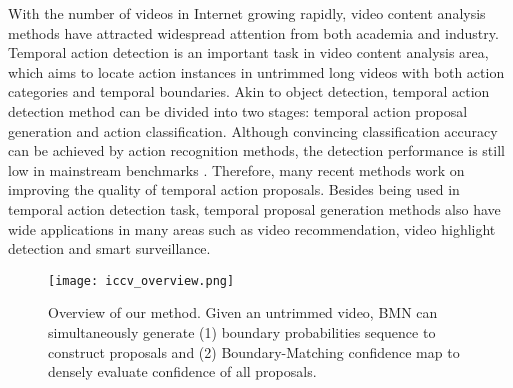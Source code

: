 \documentclass[10pt,twocolumn,letterpaper]{article}
\begin{document}
With the number of videos in Internet growing rapidly, video content analysis methods have attracted widespread attention from both academia and industry.
Temporal action detection is an important task in video content analysis area, which aims to locate action instances in untrimmed long videos with both action categories and temporal boundaries.
Akin to object detection, temporal action detection method can be divided into two stages: temporal action proposal generation and action classification.
Although convincing classification accuracy can be achieved by action recognition methods, the detection performance is still low in mainstream benchmarks \cite{jiang2014thumos,caba2015activitynet}. Therefore, many recent methods work on improving the quality of temporal action proposals.  Besides being used in temporal action detection task, temporal proposal generation methods also have wide applications in many areas such as video recommendation, video highlight detection and smart surveillance. 



\begin{figure}[t]
\setlength{\abovecaptionskip}{-0.1cm} \setlength{\belowcaptionskip}{-0.3cm} \begin{center}
\begin{minipage}[b]{1.0\linewidth}
  \centering
  \centerline{\texttt{[image: iccv\_overview.png]}}
  \medskip
\end{minipage}
\end{center}
\vspace{-0.5cm}
   \caption{Overview of our method. Given an untrimmed video, BMN can simultaneously generate (1) boundary probabilities sequence to construct proposals and (2) Boundary-Matching confidence map to densely evaluate confidence of all proposals.}
\label{fig:overview}
\vspace{-0.3cm}
\end{figure}
\end{document}
